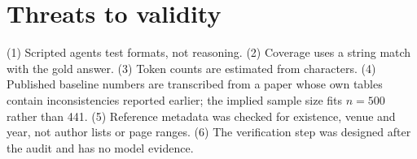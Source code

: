 \section{Threats to validity}
\label{sec:threats}

(1) Scripted agents test formats, not reasoning. (2) Coverage uses a string match with the gold answer. (3) Token counts are estimated from characters. (4) Published baseline numbers are transcribed from a paper whose own tables contain inconsistencies reported earlier; the implied sample size fits $n{=}500$ rather than 441. (5) Reference metadata was checked for existence, venue and year, not author lists or page ranges. (6) The verification step was designed after the audit and has no model evidence.
